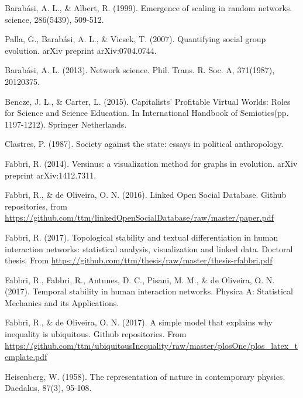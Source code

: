 \documentclass[12pt,fleqn]{article}
\begin{document}
\begin{thebibliography}{99}
\fontsize{11}{0}\selectfont
{}
Barabási, A. L., \& Albert, R. (1999). Emergence of scaling in random networks. science, 286(5439), 509-512.

Palla, G., Barabási, A. L., \& Vicsek, T. (2007). Quantifying social group evolution. arXiv preprint arXiv:0704.0744.
 
Barabási, A. L. (2013). Network science. Phil. Trans. R. Soc. A, 371(1987), 20120375.

Bencze, J. L., \& Carter, L. (2015). Capitalists’ Profitable Virtual Worlds: Roles for Science and Science Education. In International Handbook of Semiotics(pp. 1197-1212). Springer Netherlands.

Clastres, P. (1987). Society against the state: essays in political anthropology.

Fabbri, R. (2014). Versinus: a visualization method for graphs in evolution. arXiv preprint arXiv:1412.7311.

	Fabbri, R., \& de Oliveira, O. N. (2016). Linked Open Social Database. Github repositories, from \url{https://github.com/ttm/linkedOpenSocialDatabase/raw/master/paper.pdf}

Fabbri, R. (2017). Topological stability and textual differentiation in human interaction networks:
		statistical analysis, visualization and linked data. Doctoral thesis.
		From \url{https://github.com/ttm/thesis/raw/master/thesis-rfabbri.pdf}

Fabbri, R., Fabbri, R., Antunes, D. C., Pisani, M. M., \& de Oliveira, O. N. (2017). Temporal stability in human interaction networks. Physica A: Statistical Mechanics and its Applications.

Fabbri, R., \& de Oliveira, O. N. (2017). A simple model that explains why inequality is ubiquitous. Github repositories.
		From \url{https://github.com/ttm/ubiquitousInequality/raw/master/plosOne/plos_latex_template.pdf}

Heisenberg, W. (1958). The representation of nature in contemporary physics. Daedalus, 87(3), 95-108.


\end{thebibliography}
\end{document}
